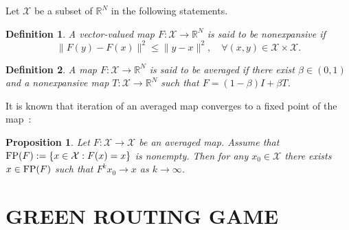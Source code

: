 \documentclass[letterpaper, 10 pt, conference]{ieeeconf}  %
\newcommand{\mc}[1]{\mathcal{#1}}
\newcommand{\bR}{\mathbb{R}}
\newtheorem{defin}{Definition}
\newtheorem{prop}{Proposition}
\begin{document}
Let $\mc{X}$ be a subset of $\bR^N$ in the following statements.
\begin{defin}
A vector-valued map $F:\mc{X}\to\bR^N$ is said to be \emph{nonexpansive} if
\[
 \|F(y)-F(x)\|^2 \leq \|y-x\|^2,\quad \forall (x,y)\in\mc{X}\times\mc{X}.
\]
\end{defin}
\begin{defin}\label{def:ave}
A map $F:\mc{X}\to\bR^N$ is said to be \emph{averaged} if there exist $\beta\in(0,1)$ and a nonexpansive map $T:\mc{X}\to\bR^N$ such that $F=(1-\beta)I+\beta T$.
\end{defin}
It is known that iteration of an averaged map converges to a fixed point of the map~\cite[Theorem 2.1]{Byrne2003Unified}:
\begin{prop}\label{prop:FP}
Let $F:\mc{X}\to\mc{X}$ be an averaged map.
Assume that ${\rm FP}(F):=\{x\in\mc{X}:F(x)=x\}$ is nonempty.
Then for any $x_0\in\mc{X}$ there exists $x\in{\rm FP}(F)$ such that $F^kx_0\to x$ as $k\to\infty$.
\end{prop}
\fi

\section{GREEN ROUTING GAME}
\label{sec:model}
\end{document}
